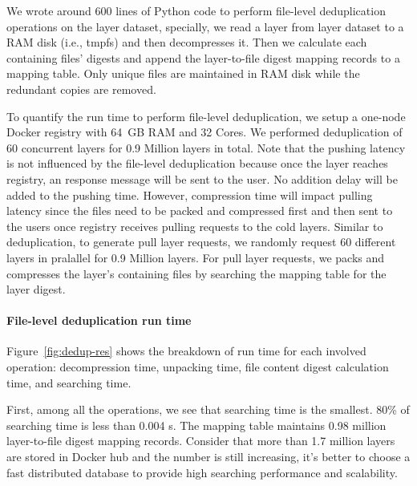 We wrote around 600 lines of Python code to perform file-level deduplication
operations on the layer dataset, specially, we read a layer from layer dataset
to a RAM disk (i.e., tmpfs) and then decompresses it. Then we
calculate each containing files' digests and append the layer-to-file digest
mapping records to a mapping table. 
Only unique files are maintained in RAM
disk while the redundant copies are removed.

To quantify the run time to perform file-level deduplication, we setup a
one-node Docker registry with 64~GB RAM and 32 Cores.  We performed
deduplication of 60 concurrent layers for 0.9 Million layers in total.
%
%
Note that the pushing latency is not influenced by the file-level deduplication
because once the layer reaches registry, an response message will be sent to
the user. No addition delay will be added to the pushing time. However,
compression time will impact pulling latency since the files need to be packed
and compressed first and then sent to the users once registry receives pulling
requests to the cold layers. Similar to deduplication, to generate pull layer
requests, we randomly request 60 different layers in pralallel for 0.9 Million
layers. For pull layer requests, we packs and compresses the layer's containing
files by searching the mapping table for the layer digest. 

\paragraph{File-level deduplication run time}

%
Figure~\ref{fig:dedup-res} shows the breakdown of run time for each
involved operation: decompression time, unpacking time, file content digest
calculation time, and searching time.

First, among all the operations, we see that searching time is the
smallest. 80\% of searching time is less than 0.004 s. The mapping table
maintains 0.98 million layer-to-file digest mapping records. Consider that more
than 1.7 million layers are stored in Docker hub and the number is still
increasing, it's better to choose a fast distributed database to provide high
searching performance and scalability.
%
  
